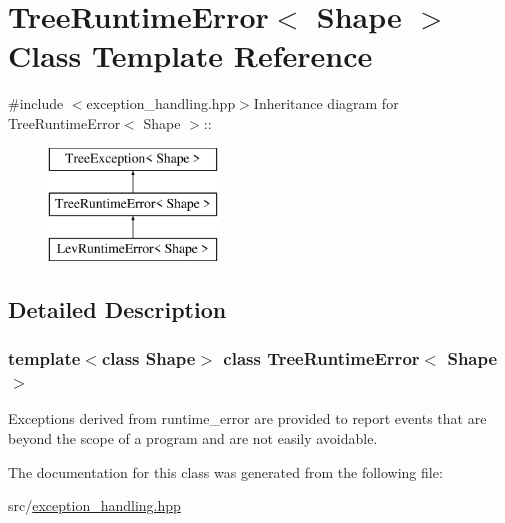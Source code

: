 \hypertarget{classTreeRuntimeError}{
\section{TreeRuntimeError$<$ Shape $>$ Class Template Reference}
\label{classTreeRuntimeError}
}


{\ttfamily \#include $<$exception\_\-handling.hpp$>$}Inheritance diagram for TreeRuntimeError$<$ Shape $>$::\begin{figure}[H]
\begin{center}
\leavevmode
\includegraphics[height=3cm]{classTreeRuntimeError}
\end{center}
\end{figure}


\subsection{Detailed Description}
\subsubsection*{template$<$class Shape$>$ class TreeRuntimeError$<$ Shape $>$}

Exceptions derived from runtime\_\-error are provided to report events that are beyond the scope of a program and are not easily avoidable. 

The documentation for this class was generated from the following file:\begin{DoxyCompactItemize}
\item 
src/\hyperlink{exception__handling_8hpp}{exception\_\-handling.hpp}\end{DoxyCompactItemize}
